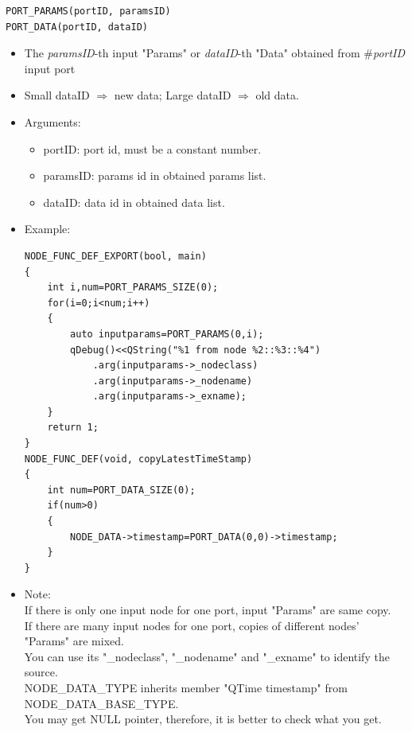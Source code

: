 \documentclass[a4paper,10pt]{book}
\begin{document}
\begin{mdframed}
\begin{verbatim}
PORT_PARAMS(portID, paramsID)
PORT_DATA(portID, dataID)
\end{verbatim}
\begin{itemize}
 \item The {\em{paramsID}}-th input "Params" or {\em{dataID}}-th "Data" obtained from \#{\em{portID}} input port
 \item Small dataID $\Rightarrow$ new data; Large dataID $\Rightarrow$ old data.
 \item Arguments:
 \begin{itemize}
  \item portID: port id, must be a constant number.
  \item paramsID: params id in obtained params list.
  \item dataID: data id in obtained data list.
 \end{itemize}
 \item Example:
 \begin{verbatim}
NODE_FUNC_DEF_EXPORT(bool, main)
{
    int i,num=PORT_PARAMS_SIZE(0);
    for(i=0;i<num;i++)
    {
        auto inputparams=PORT_PARAMS(0,i);
        qDebug()<<QString("%1 from node %2::%3::%4")
            .arg(inputparams->_nodeclass)
            .arg(inputparams->_nodename)
            .arg(inputparams->_exname);
    }
    return 1;
}
NODE_FUNC_DEF(void, copyLatestTimeStamp)
{
    int num=PORT_DATA_SIZE(0);
    if(num>0)
    {
        NODE_DATA->timestamp=PORT_DATA(0,0)->timestamp;
    }
}
 \end{verbatim}
 \item Note: \\
 If there is only one input node for one port, input "Params" are same copy. \\
 If there are many input nodes for one port, copies of different nodes' "Params" are mixed. \\
 You can use its "\_nodeclass", "\_nodename" and "\_exname" to identify the source. \\
 NODE\_DATA\_TYPE inherits member "QTime timestamp" from NODE\_DATA\_BASE\_TYPE. \\
 You may get NULL pointer, therefore, it is better to check what you get.
\end{itemize}
\end{mdframed}
\end{document}
